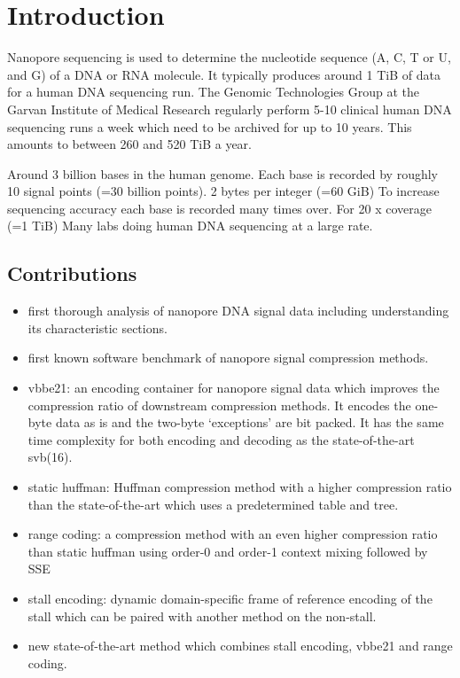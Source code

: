 \chapter{Introduction}



Nanopore sequencing is used to determine the nucleotide sequence (A, C, T or U, and G) of a DNA or RNA molecule.
It typically produces around 1 TiB of data for a human DNA sequencing run.
The Genomic Technologies Group at the Garvan Institute of Medical Research regularly perform 5-10 clinical human DNA sequencing runs a week which need to be archived for up to 10 years. This amounts to between 260 and 520 TiB a year.

Around 3 billion bases in the human genome.
Each base is recorded by roughly 10 signal points (=30 billion points).
2 bytes per integer (=60 GiB)
To increase sequencing accuracy each base is recorded many times over. For 20 x coverage (=1 TiB)
Many labs doing human DNA sequencing at a large rate.

\section{Contributions}
\begin{itemize}
\item first thorough analysis of nanopore DNA signal data including
	understanding its characteristic sections.
\item first known software benchmark of nanopore signal compression methods.
\item vbbe21: an encoding container for nanopore signal data which improves the
	compression ratio of downstream compression methods.
It encodes the one-byte data as is and the two-byte `exceptions' are bit packed.
It has the same time complexity for both encoding and decoding as the
state-of-the-art svb(16).
\item static huffman: Huffman compression method with a higher compression ratio than
	the state-of-the-art which uses a predetermined table and tree.
\item range coding: a compression method with an even higher compression ratio
	than static huffman using order-0 and order-1 context mixing followed by
	SSE
\item stall encoding: dynamic domain-specific frame of reference encoding of the
	stall which can be paired with another method on the non-stall.
\item new state-of-the-art method which combines stall encoding, vbbe21 and
	range coding.
\end{itemize}

